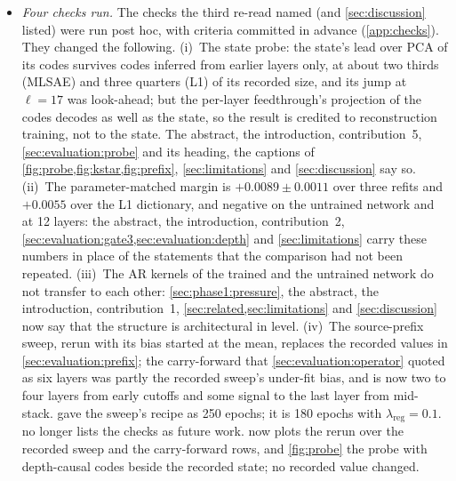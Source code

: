 \begin{itemize}
    unqualified ``seed'' is; and \cref{sec:discussion} names two further
    checks that fit the study GPU.
  \item \emph{Four checks run.} The checks the third re-read named (and
    \cref{sec:discussion} listed) were run post hoc, with criteria committed
    in advance (\cref{app:checks}). They changed the following.
    (i)~The state probe: the state's lead over PCA of its codes survives
    codes inferred from earlier layers only, at about two thirds (MLSAE) and
    three quarters (L1) of its recorded size, and its jump at $\ell{=}17$ was
    look-ahead; but the per-layer feedthrough's projection of the codes
    decodes as well as the state, so the result is credited to
    reconstruction training, not to the state. The abstract, the
    introduction, contribution~5, \cref{sec:evaluation:probe} and its
    heading, the captions of \cref{fig:probe,fig:kstar,fig:prefix},
    \cref{sec:limitations} and \cref{sec:discussion} say so.
    (ii)~The parameter-matched margin is $+0.0089 \pm 0.0011$ over three
    refits and $+0.0055$ over the L1 dictionary, and negative on the
    untrained network and at 12 layers: the abstract, the introduction,
    contribution~2, \cref{sec:evaluation:gate3,sec:evaluation:depth} and
    \cref{sec:limitations} carry these numbers in place of the statements
    that the comparison had not been repeated.
    (iii)~The AR kernels of the trained and the untrained network do not
    transfer to each other: \cref{sec:phase1:pressure}, the abstract, the
    introduction, contribution~1, \cref{sec:related,sec:limitations} and
    \cref{sec:discussion} now say that the structure is architectural in
    level.
    (iv)~The source-prefix sweep, rerun with its bias started at the mean,
    replaces the recorded values in \cref{sec:evaluation:prefix}; the
    carry-forward that \cref{sec:evaluation:operator} quoted as six layers
    was partly the recorded sweep's under-fit bias, and is now two to four
    layers from early cutoffs and some signal to the last layer from
    mid-stack.  gave the sweep's recipe as 250 epochs;
    it is 180 epochs with $\lambda_{\mathrm{reg}} = 0.1$.
     no longer lists the checks as future work.
     now plots the rerun over the recorded sweep and the
    carry-forward rows, and \cref{fig:probe} the probe with depth-causal codes
    beside the recorded state; no recorded value changed.
\end{itemize}


